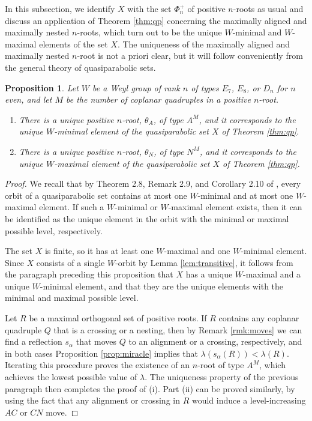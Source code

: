 \documentclass[11pt]{amsart}
\theoremstyle{plain}
\newtheorem{prop}[theorem]{Proposition}
\theoremstyle{definition}
\theoremstyle{remark}
\numberwithin{equation}{subsection}
\newcommand{\al}{\alpha}
\newcommand{\coplanar}{coplanar\xspace}
\begin{document}
In this subsection, we identify $X$ with the set $\Phi^+_n$ of positive
$n$-roots as usual and discuss an application of Theorem \ref{thm:qp} concerning
the maximally aligned and maximally nested $n$-roots, which turn out to be the
unique $W$-minimal and $W$-maximal elements of the set $X$.  The uniqueness of
the maximally aligned and maximally nested $n$-root is not a priori clear, but
it will follow conveniently from the general theory of quasiparabolic sets.


\begin{prop}
    \label{prop:minmax}
Let $W$ be a Weyl group of rank $n$ of types $E_7$, $E_8$, or $D_n$ for $n$
even, and let $M$ be the number of \coplanar quadruples in a positive $n$-root.
\begin{enumerate}
    \item[{\rm (i)}]{There is a unique positive $n$-root, $\theta_A$, of type
     $A^M$, and it corresponds to the unique $W$-minimal element of the
 quasiparabolic set $X$ of Theorem \ref{thm:qp}.}
\item[{\rm (ii)}]{There is a unique positive $n$-root, $\theta_N$,  of type
     $N^M$, and it corresponds to the unique $W$-maximal element of the
 quasiparabolic set $X$ of Theorem \ref{thm:qp}.}
    \end{enumerate}
\end{prop}

\begin{proof}
We recall that by Theorem 2.8, Remark 2.9, and Corollary 2.10 of \cite{rains13},
every orbit of a quasiparabolic set contains at most one $W$-minimal and at most
one $W$-maximal element.  If such a $W$-minimal or $W$-maximal element exists,
then it can be identified as the unique element in the orbit with the minimal or maximal
possible level, respectively.

The set $X$ is finite, so it has at least one $W$-maximal and one $W$-minimal
element.  Since $X$ consists of a single $W$-orbit by Lemma
\ref{lem:transitive}, it follows from the paragraph preceding this proposition
that $X$ has a unique $W$-maximal and a unique $W$-minimal element, and that
they are the unique elements with the minimal and maximal possible level.

Let $R$ be a maximal orthogonal set of positive roots. If $R$ contains any
coplanar quadruple $Q$ that is a crossing or a nesting, then by Remark
\ref{rmk:moves}  we can find a reflection $s_\al$ that moves $Q$ to an alignment
or a crossing, respectively, and in both cases Proposition \ref{prop:miracle}
implies that $\lambda(s_\al(R))<\lambda(R)$. Iterating this procedure proves the
existence of an $n$-root of type $A^M$, which achieves the lowest possible value
of $\lambda$.  The uniqueness property of the previous paragraph then completes
the proof of (i). Part (ii) can be proved similarly, by using the fact that any
alignment or crossing in $R$ would induce a level-increasing $AC$ or $CN$ move.
\end{proof}
\end{document}
